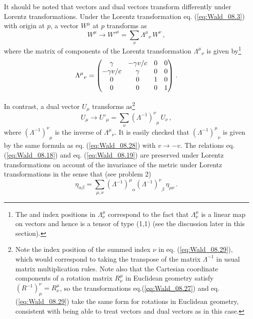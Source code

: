 It should be noted that vectors and dual vectors transform differently under Lorentz transformations. Under the Lorentz transformation eq. (\ref{eq:Wald_08.3}) with origin at $p$, a vector $W^\mu$ at $p$ transforms as 
\begin{equation}\label{eq:Wald_08.27}
W^\mu \longrightarrow {W'}^\mu = \sum_\nu {\Lambda^\mu}_\nu \, W^\nu \,,
\end{equation}
where the matrix of components of the Lorentz transformation ${\Lambda^\mu}_\nu$ is given by\footnote{The  and  index positions in $\Lambda^\mu_\nu$ correspond to the fact that $\Lambda^\mu_\nu$ is a linear map on vectors and hence is a tensor of type (1,1) (see the discussion later in this section).} 
\begin{equation}\label{eq:Wald_08.28}
{\Lambda^\mu}_\nu = \mqty(  \gamma     & -\gamma v/c & 0 & 0 \\
                         -\gamma v/c &  \gamma     & 0 & 0 \\
                             0       &       0     & 1 & 0 \\
                             0       &       0     & 0 & 1 ) \;.
\end{equation}

In contrast, a dual vector $U_\mu$ transforms as\footnote{Note the index position of the summed index $\nu$ in eq. (\ref{eq:Wald_08.29}), which would correspond to taking the transpose of the matrix $\Lambda^{-1}$ in usual matrix multiplication rules. Note also that the Cartesian coordinate components of a rotation matrix $R^\mu_\nu$ in Euclidean geometry satisfy 
$(R^{-1})^\nu_\mu = R^\mu_\nu$, so the transformations eq.(\ref{eq:Wald_08.27}) and eq.(\ref{eq:Wald_08.29}) take the same form for rotations in Euclidean geometry, consistent with being able to treat vectors and dual vectors as  in this case.}
\begin{equation}\label{eq:Wald_08.29}
U_\mu \longrightarrow {U'}_\mu = \sum_\nu {(\Lambda^{-1})^\nu}_\mu \, U_\nu \,,
\end{equation}
where ${(\Lambda^{-1})^\nu}_\mu$ is the inverse of ${\Lambda^\mu}_\nu$. It is easily checked that ${(\Lambda^{-1})^\mu}_\nu$ is given by the same formula as eq. (\ref{eq:Wald_08.28}) with $v \rightarrow - v$. The relations eq. (\ref{eq:Wald_08.18}) and eq. (\ref{eq:Wald_08.19}) are preserved under Lorentz transformations on account of the invariance of the metric under Lorentz transformations in the sense that (see problem 2)
\begin{equation}\label{eq:Wald_08.30}
\eta_{\alpha\beta} = \sum_{\mu,\nu} {(\Lambda^{-1})^\mu}_\alpha {(\Lambda^{-1})^\nu}_\beta \, \eta_{\mu\nu} \,.
\end{equation}

